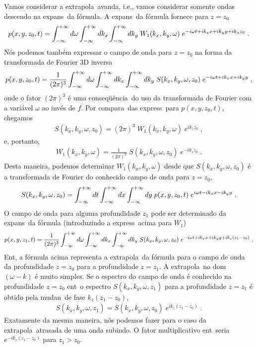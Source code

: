 Vamos considerar a extrapola\cao\ avan\ca da, i.e., vamos considerar
somente ondas des\-cendo na expans\ao\ da f\'ormula. A expans\ao\ da
f\'ormula fornece para $z = z_0$
\begin{eqnarray} 
p(x,y,z_0,t) = \int_{-\infty}^{+\infty} d\omega \int_{-\infty}^{+\infty} dk_x \int_{-\infty}^{+\infty} dk_y \;
W_1(k_x,k_y,\omega) \; e^{-i\omega t + ik_x x + ik_y y + ik_z z_0} \; .
\end{eqnarray}
N\'os podemos tamb\'em expressar o campo de onda para $z = z_0$
na forma da transformada de Fourier 3D inversa
\begin{eqnarray} 
p(x,y,z_0,t)=\frac{1}{(2\pi)^3}\int_{-\infty}^{+\infty} d\omega \int_{-\infty}^{+\infty} dk_x \int_{-\infty}^{+\infty} dk_y \;
S(k_x,k_y,\omega,z_0) \; e^{-i\omega t + ik_x x + ik_y y} \; ,
\end{eqnarray}
onde o fator $(2\pi)^3$ \'e uma conseq\"u\^encia\ do uso da transformada
de Fourier com a vari\'avel $\omega$ ao inv\'es de $f$. Por compara\cao\
das express\oes\ para $p(x,y,z_0,t)$, chegamos
\begin{eqnarray}
S(k_x,k_y,\omega,z_0) = (2\pi)^3 \; W_1(k_x,k_y,\omega) \;
e^{ik_z z_0} \; ,
\end{eqnarray}
e, portanto,
\begin{eqnarray}
W_1(k_x,k_y,\omega) = \frac{1}{(2\pi)^3} \; S(k_x,k_y,\omega,z_0) \;
e^{-ik_z z_0} \; .
\end{eqnarray}
Desta maneira, podemos determinar $W_1(k_x,k_y,\omega)$ desde que
$S(k_x,k_y,\omega,z_0)$ \'e a transformada de Fourier do conhecido
campo de onda para $z = z_0$,
\begin{eqnarray}
S(k_x,k_y,\omega,z_0) = \int_{-\infty}^{+\infty} dt \int_{-\infty}^{+\infty} dx \int_{-\infty}^{+\infty} dy \; p(x,y,z_0,t) \;
e^{i\omega t - ik_x x - ik_y y} \; .
\end{eqnarray}
O campo de onda para alguma profundidade $z_1$ pode ser determinado
da expans\ao\ da f\'ormula (introduzindo a express\ao\ acima para $W_1$)
\begin{eqnarray}
p(x,y,z_1,t)=\frac{1}{(2\pi)^3} \int_{-\infty}^{+\infty} d\omega \int_{-\infty}^{+\infty} dk_x \int_{-\infty}^{+\infty} dk_y
\; S(k_x,k_y,\omega,z_0) \; e^{-i\omega t + ik_x x + ik_y y +
ik_z(z_1 - z_0)}
\; .
\end{eqnarray}
Ent\ao, a f\'ormula acima representa a extrapola\cao\ da f\'ormula para
o campo de onda da profundidade $z = z_0$ para a profundidade $z = z_1$.
A extrapola\cao\ no dom\inio\ $(\omega - k)$ \'e muito simples. Se o
espectro do campo de onda \'e conhecido na profundidade $z = z_0$
ent\ao\ o espectro $S(k_x,k_y,\omega,z_1)$ para a profundidade $z = z_1$
\'e obtido pela mudan\ca\ de fase $k_z(z_1 - z_0)$,
\begin{eqnarray}
S(k_x,k_y,\omega,z_1) = S(k_x,k_y,\omega,z_0) \; e^{ik_z(z_1 - z_0)} \; .
\end{eqnarray}
Exatamente da mesma maneira, n\'os podemos fazer para o caso
da extrapola\cao\ atrasada de uma onda subindo. O fator multiplicativo
ent\ao\ seria $e^{-ik_z(z_1 - z_0)}$ para $z_1> z_0$.


